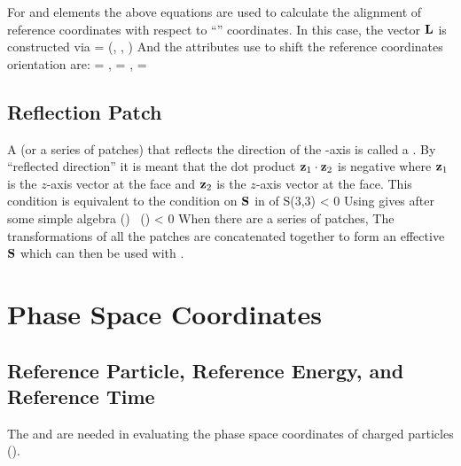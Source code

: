 For  and  elements the above equations are
used to calculate the alignment of reference coordinates with respect
to ``'' coordinates. In this case, the vector ${\bf L}$ is
constructed via
\Begineq
  \bfL = (, \qquad {}, \qquad {})
\Endeq
And the attributes use to shift the reference coordinates orientation are:
\Begineq
  \Theta = , \qquad \Phi = , \qquad \Psi = 
\Endeq

\subsection{Reflection Patch}
\label{s:reflect.patch}

A  (or a series of patches) that reflects the direction of
the -axis is called a  . By ``reflected
direction'' it is meant that the dot product ${\bf z}_1 \cdot {\bf z}_2$ is
negative where ${\bf z}_1$ is the $z$-axis vector at the 
face and ${\bf z}_2$ is the $z$-axis vector at the  face. This
condition is equivalent to the condition on ${\bf S}$ in  of
\Begineq
  S(3,3) < 0
  \label{s330}
\Endeq
Using  gives after some simple algebra
\Begineq
  \cos() \, \cos() < 0
\Endeq
When there are a series of patches, The transformations of all the
patches are concatenated together to form an effective ${\bf S}$ which
can then be used with .

\section{Phase Space Coordinates}
\label{s:phase.coords}

\subsection{Reference Particle, Reference Energy, and Reference Time}
\label{s:ref.energy}

The  and  are needed in
evaluating the phase space coordinates of charged particles
().  

